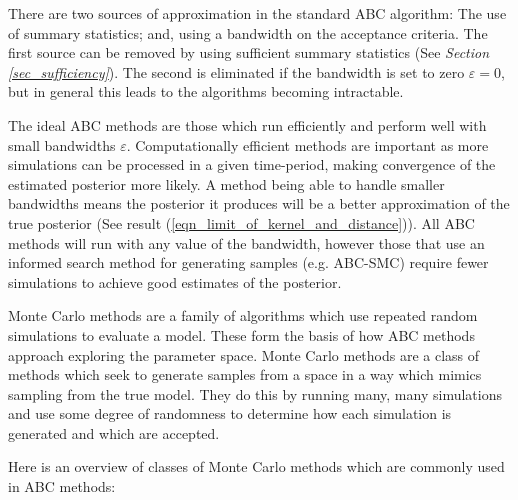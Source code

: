 \documentclass[11pt,a4paper]{article}
\theoremstyle{break}
\begin{document}
  \par There are two sources of approximation in the standard ABC algorithm: The use of summary statistics; and, using a bandwidth on the acceptance criteria. The first source can be removed by using sufficient summary statistics (See \textit{Section \ref{sec_sufficiency}}). The second is eliminated if the bandwidth is set to zero $\varepsilon=0$, but in general this leads to the algorithms becoming intractable.

  \par The ideal ABC methods are those which run efficiently and perform well with small bandwidths $\varepsilon$. Computationally efficient methods are important as more simulations can be processed in a given time-period, making convergence of the estimated posterior more likely. A method being able to handle smaller bandwidths means the posterior it produces will be a better approximation of the true posterior (See result (\ref{eqn_limit_of_kernel_and_distance})). All ABC methods will run with any value of the bandwidth, however those that use an informed search method for generating samples (e.g. ABC-SMC) require fewer simulations to achieve good estimates of the posterior.

  \par Monte Carlo methods are a family of algorithms which use repeated random simulations to evaluate a model. These form the basis of how ABC methods approach exploring the parameter space. Monte Carlo methods are a class of methods which seek to generate samples from a space in a way which mimics sampling from the true model. They do this by running many, many simulations and use some degree of randomness to determine how each simulation is generated and which are accepted.

  \par Here is an overview of classes of Monte Carlo methods which are commonly used in ABC methods:
\end{document}
